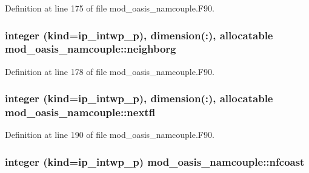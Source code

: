 Definition at line 175 of file mod\+\_\+oasis\+\_\+namcouple.\+F90.

\hypertarget{classmod__oasis__namcouple_a883d88938c50264711c53af2b555c3db}{
\subsubsection[{neighborg}]{\setlength{\rightskip}{0pt plus 5cm}integer (kind=ip\+\_\+intwp\+\_\+p), dimension(\+:), allocatable mod\+\_\+oasis\+\_\+namcouple\+::neighborg\hspace{0.3cm}{\ttfamily [private]}}}\label{classmod__oasis__namcouple_a883d88938c50264711c53af2b555c3db}


Definition at line 178 of file mod\+\_\+oasis\+\_\+namcouple.\+F90.

\hypertarget{classmod__oasis__namcouple_a8302411d5a02efd9a6dc7f784fbb0d4d}{
\subsubsection[{nextfl}]{\setlength{\rightskip}{0pt plus 5cm}integer (kind=ip\+\_\+intwp\+\_\+p), dimension(\+:), allocatable mod\+\_\+oasis\+\_\+namcouple\+::nextfl\hspace{0.3cm}{\ttfamily [private]}}}\label{classmod__oasis__namcouple_a8302411d5a02efd9a6dc7f784fbb0d4d}


Definition at line 190 of file mod\+\_\+oasis\+\_\+namcouple.\+F90.

\hypertarget{classmod__oasis__namcouple_a57f1b6f111a5257a4d6f5a4b18fa6250}{
\subsubsection[{nfcoast}]{\setlength{\rightskip}{0pt plus 5cm}integer (kind=ip\+\_\+intwp\+\_\+p) mod\+\_\+oasis\+\_\+namcouple\+::nfcoast\hspace{0.3cm}{\ttfamily [private]}}}\label{classmod__oasis__namcouple_a57f1b6f111a5257a4d6f5a4b18fa6250}


